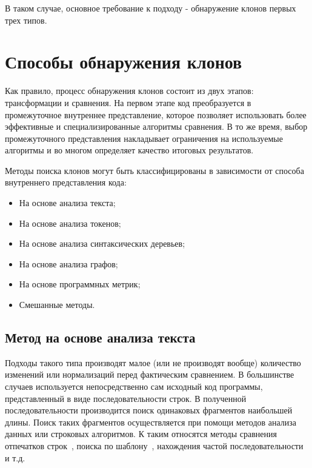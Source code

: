 В таком случае, основное требование к подходу - обнаружение клонов первых трех типов.
% 

\section{Способы обнаружения клонов}

Как правило, процесс обнаружения клонов состоит из двух этапов: трансформации и сравнения. На первом этапе код преобразуется в промежуточное внутреннее представление, которое позволяет использовать более эффективные и специализированные алгоритмы сравнения. В то же время, выбор промежуточного представления накладывает ограничения на используемые алгоритмы и во многом определяет качество итоговых результатов.

Методы поиска клонов могут быть классифицированы в зависимости от способа внутреннего представления кода:
\begin{itemize}
\setlength\itemsep{0mm}
\item На основе анализа текста;
\item На основе анализа токенов;
\item На основе анализа синтаксических деревьев;
\item На основе анализа графов;
\item На основе программных метрик;
\item Смешанные методы.
\end{itemize}

\subsection{Метод на основе анализа текста}

Подходы такого типа производят малое (или не производят вообще) количество изменений или нормализаций перед фактическим сравнением. В большинстве случаев используется непосредственно сам исходный код программы, представленный в виде последовательности строк. В полученной последовательности производится поиск одинаковых фрагментов наибольшей длины. Поиск таких фрагментов осуществляется при помощи методов анализа данных или строковых алгоритмов. К таким относятся методы сравнения отпечатков строк~\cite{fingerprints}, поиска по шаблону~\cite{templates2}, нахождения частой последовательности~\cite{sequence} и т.д.

